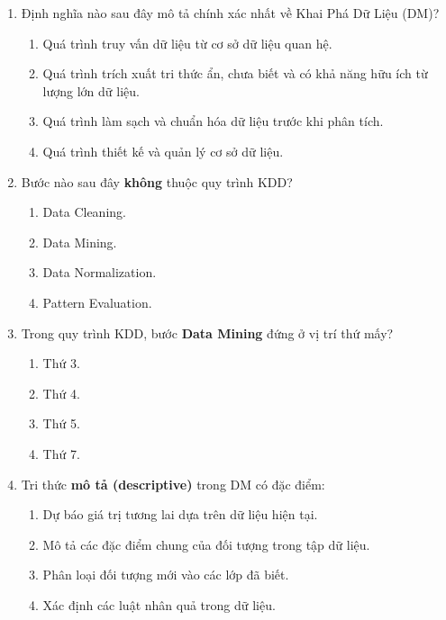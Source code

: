 \documentclass[10pt]{article}
\begin{document}
\begin{enumerate}[leftmargin=*, label=\textbf{Câu \arabic*.}]

    \item Định nghĩa nào sau đây mô tả chính xác nhất về Khai Phá Dữ Liệu (DM)?
    \begin{enumerate}[label=\Alph*.]
        \item Quá trình truy vấn dữ liệu từ cơ sở dữ liệu quan hệ.
        \item Quá trình trích xuất tri thức ẩn, chưa biết và có khả năng hữu ích từ lượng lớn dữ liệu.
        \item Quá trình làm sạch và chuẩn hóa dữ liệu trước khi phân tích.
        \item Quá trình thiết kế và quản lý cơ sở dữ liệu.
    \end{enumerate}

    \item Bước nào sau đây \textbf{không} thuộc quy trình KDD?
    \begin{enumerate}[label=\Alph*.]
        \item Data Cleaning.
        \item Data Mining.
        \item Data Normalization.
        \item Pattern Evaluation.
    \end{enumerate}

    \item Trong quy trình KDD, bước \textbf{Data Mining} đứng ở vị trí thứ mấy?
    \begin{enumerate}[label=\Alph*.]
        \item Thứ 3.
        \item Thứ 4.
        \item Thứ 5.
        \item Thứ 7.
    \end{enumerate}

    \item Tri thức \textbf{mô tả (descriptive)} trong DM có đặc điểm:
    \begin{enumerate}[label=\Alph*.]
        \item Dự báo giá trị tương lai dựa trên dữ liệu hiện tại.
        \item Mô tả các đặc điểm chung của đối tượng trong tập dữ liệu.
        \item Phân loại đối tượng mới vào các lớp đã biết.
        \item Xác định các luật nhân quả trong dữ liệu.
    \end{enumerate}


\end{enumerate}
\end{document}
